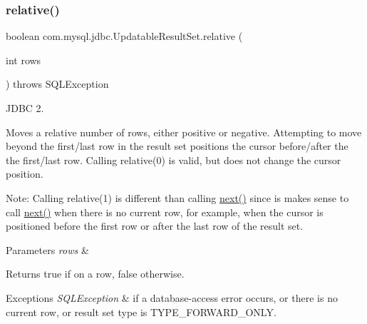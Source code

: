 \subsubsection{\texorpdfstring{relative()}{relative()}}
{\footnotesize\ttfamily boolean com.\+mysql.\+jdbc.\+Updatable\+Result\+Set.\+relative (\begin{DoxyParamCaption}\item[{int}]{rows }\end{DoxyParamCaption}) throws S\+Q\+L\+Exception}

J\+D\+BC 2.

Moves a relative number of rows, either positive or negative. Attempting to move beyond the first/last row in the result set positions the cursor before/after the the first/last row. Calling relative(0) is valid, but does not change the cursor position. 

Note\+: Calling relative(1) is different than calling \mbox{\hyperlink{classcom_1_1mysql_1_1jdbc_1_1_updatable_result_set_abdc79070aa1242eda4a1e024f3e5e544}{next()}} since is makes sense to call \mbox{\hyperlink{classcom_1_1mysql_1_1jdbc_1_1_updatable_result_set_abdc79070aa1242eda4a1e024f3e5e544}{next()}} when there is no current row, for example, when the cursor is positioned before the first row or after the last row of the result set. 


\begin{DoxyParams}{Parameters}
{\em rows} & \\
\hline
\end{DoxyParams}
\begin{DoxyReturn}{Returns}
true if on a row, false otherwise.
\end{DoxyReturn}

\begin{DoxyExceptions}{Exceptions}
{\em S\+Q\+L\+Exception} & if a database-\/access error occurs, or there is no current row, or result set type is T\+Y\+P\+E\+\_\+\+F\+O\+R\+W\+A\+R\+D\+\_\+\+O\+N\+LY. \\
\hline
\end{DoxyExceptions}
\mbox{\label{classcom_1_1mysql_1_1jdbc_1_1_updatable_result_set_a64824468904a1fc69bc116d10d4a274f}} 
